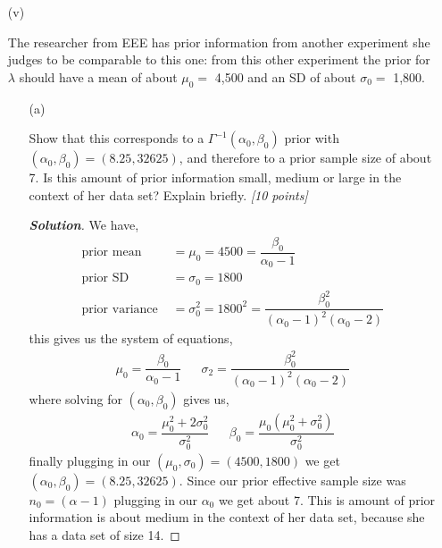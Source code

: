 \documentclass[12pt]{article}
\newenvironment{solution}{\begin{proof}[\textbf{\textit{Solution}}] }{\end{proof}}
\begin{document}
\begin{itemize}
\begin{itemize}
\newpage

\item[(v)]

The researcher from EEE has prior information from another experiment she judges to be comparable to this one: from this other experiment the prior for $\lambda$ should have a mean of about $\mu_0 =$ 4,500 and an SD of about $\sigma_0 =$ 1,800.  

\begin{itemize}

\item[(a)] 

Show that this corresponds to a $\Gamma^{ -1 }( \alpha_0, \beta_0 )$
prior with $( \alpha_0, \beta_0 ) = ( 8.25, 32625 )$, and therefore to a
prior sample size of about 7. Is this amount of prior information small, medium or large in the context of her data set? Explain briefly. \textit{[10 points]}
\begin{tcolorbox}
    \begin{solution}
        We have,
        \begin{align*}
            \text{prior mean} &= \mu_0 = 4500 = \dfrac{\beta_0}{\alpha_0 - 1} \\
            \text{prior SD} &= \sigma_0 = 1800 \\
            \text{prior variance } &= \sigma_0^{2} = 1800^{2} = \dfrac{\beta_0^{2}}{(\alpha_0 -1)^{2}(\alpha_0-2)}
        \end{align*}
        this gives us the system of equations,
        \begin{align*}
            \mu_0 = \dfrac{\beta_0}{\alpha_0 -1} && \sigma_2 = \dfrac{\beta_0^{2}}{(\alpha_0-1)^{2}(\alpha_0 -2)}
        \end{align*}
        where solving for $(\alpha_0, \beta_0)$ gives us,
        \begin{align*}
            \alpha_0 = \dfrac{\mu_0^{2} + 2\sigma_0^{2}}{\sigma_0^{2}} && \beta_0 = \dfrac{\mu_0(\mu_0^{2} + \sigma_0^{2})}{\sigma_0^{2}}
        \end{align*}
        finally plugging in our $(\mu_0, \sigma_0) = (4500, 1800)$ we get $(\alpha_0,\beta_0) = (8.25, 32625)$. Since our prior effective sample size was $n_0 = (\alpha -1)$ plugging in our $\alpha_0$ we get about 7. This is amount of prior information is about medium in the context of her data set, because she has a data set of size 14. 
    \end{solution}
\end{tcolorbox}



\end{itemize}
\end{itemize}
\end{itemize}
\end{document}
